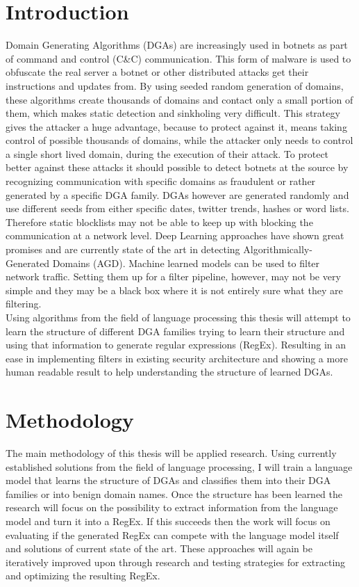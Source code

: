 \documentclass[a4paper, 12pt]{article}
\begin{document}
\section{Introduction}
Domain Generating Algorithms (DGAs) are increasingly used in botnets as part of command and control
(C\&C) communication. This form of malware is used to obfuscate the real server a botnet or other
distributed attacks get their instructions and updates from. By using seeded random generation of
domains, these algorithms create thousands of domains and contact only a small portion of them,
which makes static detection and sinkholing \cite{plohmannComprehensiveMeasurementStudy2016} very
difficult. This strategy gives the attacker a huge advantage, because to protect against it, means
taking control of possible thousands of domains, while the attacker only needs to control a single
short lived domain, during the execution of their attack. To protect better against these attacks it
should possible to detect botnets at the source by recognizing communication with specific domains
as fraudulent or rather generated by a specific DGA family. DGAs however are generated randomly and
use different seeds from either specific dates, twitter trends, hashes or word lists. Therefore
static blocklists may not be able to keep up with blocking the communication at a network level.
Deep Learning approaches have shown great promises and are currently state of the art in detecting
Algorithmically-Generated Domains (AGD). Machine learned models can be used to filter network
traffic. Setting them up for a filter pipeline, however, may not be very simple and they may be a
black box where it is not entirely sure what they are filtering.\\ 
Using algorithms from the field of language processing this thesis will attempt to learn the
structure of different DGA families trying to learn their structure and using that information to
generate regular expressions (RegEx). Resulting in an ease in implementing filters in existing
security architecture and showing a more human readable result to help understanding the structure
of learned DGAs.

\section{Methodology}
The main methodology of this thesis will be applied research. Using currently established solutions
from the field of language processing, I will train a language model that learns the structure of
DGAs and classifies them into their DGA families or into benign domain names. Once the structure has
been learned the research will focus on the possibility to extract information from the language
model and turn it into a RegEx. If this succeeds then the work will focus on evaluating if the
generated RegEx can compete with the language model itself and solutions of current state of the
art. These approaches will again be iteratively improved upon through research and testing
strategies for extracting and optimizing the resulting RegEx.
\end{document}
